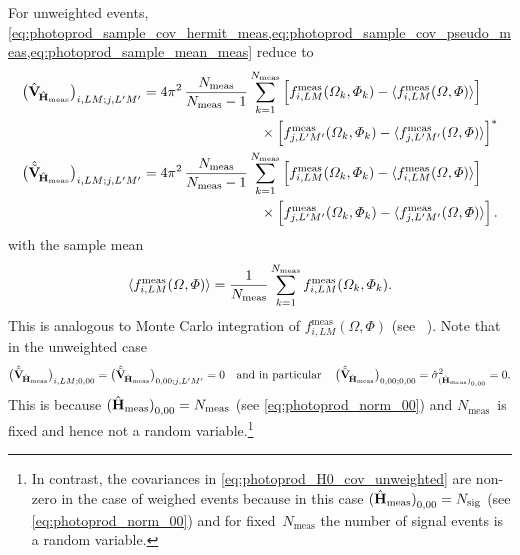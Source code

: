 For unweighted events,
\cref{eq:photoprod_sample_cov_hermit_meas,eq:photoprod_sample_cov_pseudo_meas,eq:photoprod_sample_mean_meas}
reduce to
\begin{align}
  \rBrk[1]{\covMatEstSym_{\!\hat{\vect{H}}_\text{meas}}}_{i, L M; j, L' M'}
  ={}& \begin{multlined}[t][0.7\columnwidth]
    4 \pi^2\, \frac{N_\text{meas}}{N_\text{meas} - 1} \sum_{k = 1}^{N_\text{meas}}
    \sBrk[2]{f_{i, L M}^\text{meas}(\Omega_k, \Phi_k)   - \mean{f_{i, L M}^\text{meas}(\Omega, \Phi)}}
    \\
    {} \times \sBrk[2]{f_{j, L' M'}^\text{meas}(\Omega_k, \Phi_k) - \mean{f_{j, L' M'}^\text{meas}(\Omega, \Phi)}}^*
  \end{multlined}
  \\
  \rBrk[1]{\hat{\tilde{\covMatSym}}_{\!\hat{\vect{H}}_\text{meas}}}_{i, L M; j, L' M'}
  ={}& \begin{multlined}[t][0.7\columnwidth]
    4 \pi^2\, \frac{N_\text{meas}}{N_\text{meas} - 1} \sum_{k = 1}^{N_\text{meas}}
    \sBrk[2]{f_{i, L M}^\text{meas}(\Omega_k, \Phi_k)   - \mean{f_{i, L M}^\text{meas}(\Omega, \Phi)}}
    \\
    {} \times \sBrk[2]{f_{j, L' M'}^\text{meas}(\Omega_k, \Phi_k) - \mean{f_{j, L' M'}^\text{meas}(\Omega, \Phi)}}.
  \end{multlined}
\end{align}
with the sample mean
\begin{equation}
  \mean{f_{i, L M}^\text{meas}(\Omega, \Phi)}
  = \frac{1}{N_\text{meas}} \sum_{k = 1}^{N_\text{meas}} f_{i, L M}^\text{meas}(\Omega_k, \Phi_k).
\end{equation}
This is analogous to Monte Carlo integration of $f_{i, L
M}^\text{meas}(\Omega, \Phi)$ (see \eg\
).  Note that in the
unweighted case
\begin{equation}
  \label{eq:photoprod_H0_cov_unweighted}
  \rBrk[1]{\hat{\tilde{\covMatSym}}_{\!\hat{\vect{H}}_\text{meas}}}_{i, L M; 0, 0 0}
  = \rBrk[1]{\hat{\tilde{\covMatSym}}_{\!\hat{\vect{H}}_\text{meas}}}_{0, 0 0; j, L' M'}
  = 0
  \quad\text{and in particular}\quad
  \rBrk[1]{\hat{\tilde{\covMatSym}}_{\!\hat{\vect{H}}_\text{meas}}}_{0, 0 0; 0, 0 0}
  = \hat{\sigma}_{\rBrk[0]{\hat{\vect{H}}_\text{meas}}_{0, 0 0}}^2
  = 0.
\end{equation}
This is because $\rBrk[0]{\hat{\vect{H}}_\text{meas}}_{0, 0 0} =
N_\text{meas}$ (see \cref{eq:photoprod_norm_00}) and
$N_\text{meas}$~is fixed and hence not a random variable.\footnote{In
contrast, the covariances in \cref{eq:photoprod_H0_cov_unweighted} are
non-zero in the case of weighed events because in this case
$\rBrk[0]{\hat{\vect{H}}_\text{meas}}_{0, 0 0} = N_\text{sig}$ (see
\cref{eq:photoprod_norm_00}) and for fixed~$N_\text{meas}$ the number
of signal events is a random variable.}


